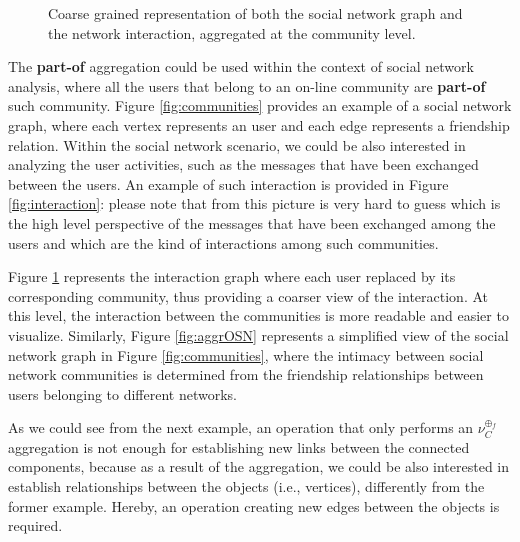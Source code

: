 \begin{figure}[!tp]
\begin{minipage}[!h]{0.7\textwidth}
		\label{fig:aggrMSG}
	\end{minipage}
\caption{Coarse grained representation of both the social network graph and the network interaction, aggregated at the community level.}
\end{figure}

\begin{example}\label{ex:8}
The \textbf{part-of} aggregation could be used within the context of social network analysis, where all the users that belong to an on-line community are \textbf{part-of} such community. Figure \vref{fig:communities} provides an example of a social network graph, where each vertex represents an user and each edge represents a friendship relation. Within the social network scenario, we could be also interested in analyzing the user activities, such as the messages that have been exchanged between the users. An example of such interaction is provided in Figure \ref{fig:interaction}: please note that from this picture is very hard to guess which is the high level perspective of the messages that have been exchanged among the users and which are the kind of interactions among such communities.

Figure \ref{fig:aggrMSG} represents the interaction graph where each user replaced by its corresponding community, thus providing a coarser view of the interaction. At this level, the interaction between the communities is more readable and easier to visualize. Similarly, Figure \ref{fig:aggrOSN} represents a simplified view of the social network graph in Figure \ref{fig:communities}, where the intimacy between social network communities is determined from the friendship relationships between users belonging to different networks.
\end{example}

As we could see from the next example, an operation that only performs an $\nu_C^{\oplus_f}$ aggregation is not enough for establishing new links between the connected components, because as a result of the aggregation, we could be also interested in establish  relationships between the objects (i.e., vertices),  differently from the former example. Hereby, an operation creating new edges between the objects is required.

